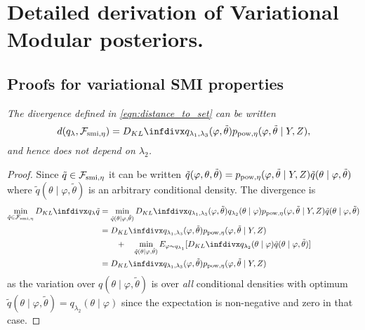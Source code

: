 \section{Detailed derivation of Variational Modular posteriors.}

\subsection{Proofs for variational SMI properties} \label{sec:vsmi_detail}

{\it
  The divergence defined in \cref{eqn:distance_to_set} can be written
  \[
    d(q_{\lambda},\mathcal{F}_{\smi, \eta})=\kl{q_{\lambda_1, \lambda_3}(\varphi, \tilde\theta)}{p_{\pow, \eta}(\varphi,\tilde\theta \mid Y,Z)},
  \]
  and hence does not depend on $\lambda_2$.
}
\begin{proof}\label{proof:var_smi_distance}
  Since $\tilde q\in \mathcal{F}_{\operatorname{\text{smi}}, \eta}$ it can be written
  $\tilde q(\varphi,\theta,\tilde\theta)=p_{\operatorname{\text{pow}}, \eta}(\varphi,\tilde\theta \mid Y,Z)\tilde q(\theta\mid \varphi,\tilde\theta)$
  where $\tilde q(\theta\mid \varphi,\tilde\theta)$ is an arbitrary conditional density. The divergence is
  \begin{align*}
    \min_{\tilde q\in \mathcal{F}_{\smi, \eta}}\kl{q_{\lambda}}{\tilde q} & =\min_{\tilde q(\theta\mid \varphi,\tilde\theta)}\kl{q_{\lambda_1,\lambda_3}(\varphi,\tilde\theta)q_{\lambda_2}(\theta\mid \varphi)}{p_{\pow, \eta}(\varphi,\tilde\theta \mid Y,Z)\tilde q(\theta\mid \varphi,\tilde\theta)}
    \\
                                                                          & =\kl{q_{\lambda_1, \lambda_3}(\varphi, \tilde\theta)}{p_{\pow, \eta}(\varphi,\tilde\theta \mid Y,Z)}
    \\
                                                                          & \qquad +\quad \min_{\tilde q(\theta\mid \varphi,\tilde\theta)} E_{\varphi\sim q_{\lambda_1}}[\kl{q_{\lambda_2}(\theta\mid \varphi)}{\tilde q(\theta\mid \varphi,\tilde\theta)}]
    \\
                                                                          & =\kl{q_{\lambda_1, \lambda_3}(\varphi, \tilde\theta)}{p_{\pow, \eta}(\varphi,\tilde\theta \mid Y,Z)}
  \end{align*}
  as the variation over $q(\theta\mid \varphi,\tilde\theta)$ is over \emph{all} conditional densities with optimum
  $\tilde q(\theta\mid \varphi,\tilde\theta)=q_{\lambda_2}(\theta\mid \varphi)$ since the expectation is non-negative and zero in that case.
\end{proof}

